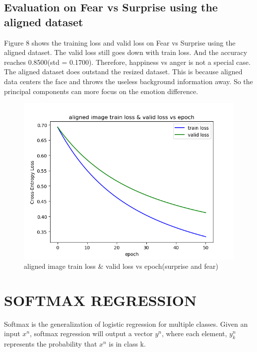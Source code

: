 \documentclass{article} %
\begin{document}
\subsection {Evaluation on Fear vs Surprise using the aligned dataset}
Figure 8 shows the training loss and valid loss on Fear vs Surprise using the aligned dataset. The valid loss still goes down with train loss. And the accuracy reaches 0.8500(std = 0.1700). Therefore, happiness vs anger is not a special case. The aligned dataset does outstand the resized dataset. This is because aligned data centers the face and throws the useless background information away. So the principal components can more focus on the emotion difference.
\begin{figure}[h]
	\centering
	\includegraphics[scale=0.5]{./graph/aligned_angerfear.png}
	\caption{aligned image train loss \& valid loss vs epoch(surprise and fear)}
\end{figure}

\section{SOFTMAX REGRESSION}
Softmax is the generalization of logistic regression for multiple classes. Given an input $x^n$, softmax regression will output a vector $y^n$, where each element, $y_k^n$ represents the probability that $x^n$ is in class k.
\end{document}

